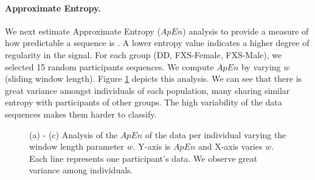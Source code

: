 \documentclass{llncs}
\begin{document}
  \paragraph{Approximate Entropy.} We next estimate Approximate Entropy ($ApEn$) analysis to provide a measure of how predictable a sequence is \cite{Restrepo:2014gs} . A lower entropy value indicates a higher degree of regularity in the signal. For each group (DD, FXS-Female, FXS-Male), we selected 15 random participants sequences. We compute $ApEn$ by varying $w$ (sliding window length). Figure \ref{fig:individual_entropy} depicts this analysis. We can see that there is great variance amongst individuals of each population, many sharing similar entropy with participants of other groups. The high variability of the data sequences makes them harder to classify.    
  \begin{figure}[h]
    \centering
    \hfill
    \hfill
    \caption{(a) - (c) Analysis of the $ApEn$ of the data per individual varying the window length parameter $w$. Y-axis is $ApEn$ and X-axis varies $w$. Each line represents one participant's data. We observe great variance among individuals.}
    \label{fig:individual_entropy}
    \vspace*{-\baselineskip}
\end{figure}

  \vspace*{-\baselineskip}
\end{document}
